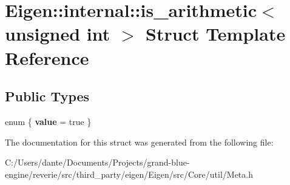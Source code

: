 \hypertarget{struct_eigen_1_1internal_1_1is__arithmetic_3_01unsigned_01int_01_4}{}\section{Eigen\+::internal\+::is\+\_\+arithmetic$<$ unsigned int $>$ Struct Template Reference}
\label{struct_eigen_1_1internal_1_1is__arithmetic_3_01unsigned_01int_01_4}
\subsection*{Public Types}
\begin{DoxyCompactItemize}
\item 
\mbox{\label{struct_eigen_1_1internal_1_1is__arithmetic_3_01unsigned_01int_01_4_aecf89e74585f72cb4ed029ce7678f28a}} 
enum \{ {\bfseries value} = true
 \}
\end{DoxyCompactItemize}


The documentation for this struct was generated from the following file\+:\begin{DoxyCompactItemize}
\item 
C\+:/\+Users/dante/\+Documents/\+Projects/grand-\/blue-\/engine/reverie/src/third\+\_\+party/eigen/\+Eigen/src/\+Core/util/Meta.\+h\end{DoxyCompactItemize}
